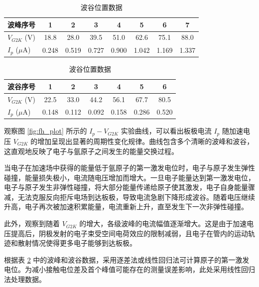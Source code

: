\documentclass[11pt]{article}
\begin{document}
\begin{table}[htbp]
\centering
\caption{弗兰克-赫兹实验波峰与波谷位置记录表}
\label{tab:fh_peaks_valleys}
\begin{subtable}{\linewidth}
\centering
\caption{波峰位置数据}
\begin{tabular}{lccccccc}
\toprule
波峰序号 & 1 & 2 & 3 & 4 & 5 & 6 & 7 \\
\midrule
$V_{G2K}$ (V) & 18.8 & 28.0 & 39.5 & 51.0 & 62.6 & 75.1 & 88.0 \\
$I_p$ ($\mu$A) & 0.248 & 0.519 & 0.727 & 0.900 & 1.042 & 1.169 & 1.337 \\
\bottomrule
\end{tabular}
\end{subtable}

\vspace{1em}

\begin{subtable}{\linewidth}
\centering
\caption{波谷位置数据}
\begin{tabular}{lcccccc}
\toprule
波谷序号 & 1 & 2 & 3 & 4 & 5 & 6 \\
\midrule
$V_{G2K}$ (V) & 22.5 & 33.0 & 44.2 & 56.1 & 67.7 & 80.5 \\
$I_p$ ($\mu$A) & 0.148 & 0.112 & 0.092 & 0.158 & 0.286 & 0.520 \\
\bottomrule
\end{tabular}
\end{subtable}
\end{table}
观察图 \ref{fig:fh_plot} 所示的 $I_p - V_{G2K}$ 实验曲线，可以看出板极电流 $I_p$ 随加速电压 $V_{G2K}$ 的增加呈现出显著的周期性变化规律。曲线包含多个清晰的波峰和波谷，这直观地反映了电子与氩原子之间发生的能量交换过程。

当电子在加速场中获得的能量低于氩原子的第一激发电位时，电子与原子发生弹性碰撞，能量损失极小，电流随电压增加而增大。一旦电子能量达到第一激发电位，电子与原子发生非弹性碰撞，将大部分能量传递给原子使其激发，电子自身能量骤减，无法克服反向拒斥电场到达板极，导致电流急剧下降形成波谷。随着电压继续升高，电子再次被加速积累能量，电流重新上升，直至发生下一次非弹性碰撞。

此外，观察到随着 $V_{G2K}$ 的增大，各级波峰的电流幅值逐渐增大。这是由于加速电压提高后，阴极发射的电子束受空间电荷效应的限制减弱，且电子在管内的运动轨迹和散射情况使得更多电子能够到达板极。

根据表 \ref{tab:fh_peaks_valleys} 中的波峰和波谷数据，采用逐差法或线性回归法可计算原子的第一激发电位。为减小接触电位差及首个峰值可能存在的测量误差影响，此处采用线性回归法处理数据。
\end{document}
